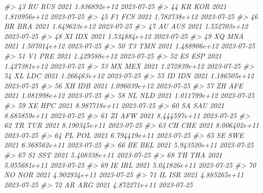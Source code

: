 \documentclass[
  xelatex, ja=standard]{bxjsbook}
\newenvironment{Shaded}{\begin{snugshade}}{\end{snugshade}}
\newcommand{\CommentTok}[1]{\textcolor[rgb]{0.56,0.35,0.01}{\textit{#1}}}
\theoremstyle{definition}
\theoremstyle{definition}
\theoremstyle{definition}
\theoremstyle{definition}
\theoremstyle{remark}
\begin{document}
\begin{Shaded}
\begin{Highlighting}[]
\CommentTok{\#\textgreater{} 43     RU   RUS 2021 1.836892e+12         2023{-}07{-}25}
\CommentTok{\#\textgreater{} 44     KR   KOR 2021 1.810956e+12         2023{-}07{-}25}
\CommentTok{\#\textgreater{} 45     F1   FCS 2021 1.782738e+12         2023{-}07{-}25}
\CommentTok{\#\textgreater{} 46     BR   BRA 2021 1.649623e+12         2023{-}07{-}25}
\CommentTok{\#\textgreater{} 47     AU   AUS 2021 1.552703e+12         2023{-}07{-}25}
\CommentTok{\#\textgreater{} 48     XI   IDX 2021 1.534884e+12         2023{-}07{-}25}
\CommentTok{\#\textgreater{} 49     XQ   MNA 2021 1.507014e+12         2023{-}07{-}25}
\CommentTok{\#\textgreater{} 50     T3   TMN 2021 1.488906e+12         2023{-}07{-}25}
\CommentTok{\#\textgreater{} 51     V1   PRE 2021 1.429588e+12         2023{-}07{-}25}
\CommentTok{\#\textgreater{} 52     ES   ESP 2021 1.427381e+12         2023{-}07{-}25}
\CommentTok{\#\textgreater{} 53     MX   MEX 2021 1.272839e+12         2023{-}07{-}25}
\CommentTok{\#\textgreater{} 54     XL   LDC 2021 1.266463e+12         2023{-}07{-}25}
\CommentTok{\#\textgreater{} 55     ID   IDN 2021 1.186505e+12         2023{-}07{-}25}
\CommentTok{\#\textgreater{} 56     XH   IDB 2021 1.096039e+12         2023{-}07{-}25}
\CommentTok{\#\textgreater{} 57     ZH   AFE 2021 1.081998e+12         2023{-}07{-}25}
\CommentTok{\#\textgreater{} 58     NL   NLD 2021 1.011799e+12         2023{-}07{-}25}
\CommentTok{\#\textgreater{} 59     XE   HPC 2021 8.987718e+11         2023{-}07{-}25}
\CommentTok{\#\textgreater{} 60     SA   SAU 2021 8.685859e+11         2023{-}07{-}25}
\CommentTok{\#\textgreater{} 61     ZI   AFW 2021 8.444597e+11         2023{-}07{-}25}
\CommentTok{\#\textgreater{} 62     TR   TUR 2021 8.190345e+11         2023{-}07{-}25}
\CommentTok{\#\textgreater{} 63     CH   CHE 2021 8.006402e+11         2023{-}07{-}25}
\CommentTok{\#\textgreater{} 64     PL   POL 2021 6.794419e+11         2023{-}07{-}25}
\CommentTok{\#\textgreater{} 65     SE   SWE 2021 6.368562e+11         2023{-}07{-}25}
\CommentTok{\#\textgreater{} 66     BE   BEL 2021 5.943520e+11         2023{-}07{-}25}
\CommentTok{\#\textgreater{} 67     S1   SST 2021 5.408338e+11         2023{-}07{-}25}
\CommentTok{\#\textgreater{} 68     TH   THA 2021 5.055681e+11         2023{-}07{-}25}
\CommentTok{\#\textgreater{} 69     IE   IRL 2021 5.041826e+11         2023{-}07{-}25}
\CommentTok{\#\textgreater{} 70     NO   NOR 2021 4.902934e+11         2023{-}07{-}25}
\CommentTok{\#\textgreater{} 71     IL   ISR 2021 4.885265e+11         2023{-}07{-}25}
\CommentTok{\#\textgreater{} 72     AR   ARG 2021 4.872271e+11         2023{-}07{-}25}

\end{Highlighting}
\end{Shaded}
\end{document}
